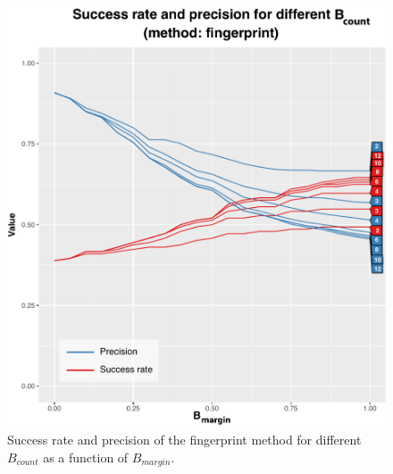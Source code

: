 \documentclass[thesis.tex]{subfiles}
\begin{document}
\begin{figure}[h!]
  \centering \includegraphics[page=1,width=\textwidth]{images/experiment/match_precision}
  \vspace{-9mm}
  \caption{Success rate and precision of the fingerprint method for different $B_{count}$ as a function of $B_{margin}$.}
  \label{figure:match_precision_fingerprint}
\end{figure}
\end{document}
